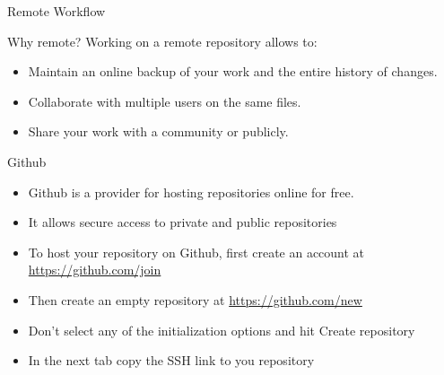 \begin{frame}[fragile]{Remote Workflow}
\end{frame}

\begin{frame}[fragile]{Why remote?}
    Working on a remote repository allows to:
    \begin{itemize}[<+->]
        \item Maintain an online backup of your work and the entire history of changes.
        \item Collaborate with multiple users on the same files.
        \item Share your work with a community or publicly.
    \end{itemize}
\end{frame}

\begin{frame}[fragile]{Github}
    \begin{itemize}
        \item Github is a provider for hosting repositories online for free.
        \item It allows secure access to private and public repositories
        \item To host your repository on Github, first create an account at \url{https://github.com/join}
        \item Then create an empty repository at \url{https://github.com/new}
        \item Don't select any of the initialization options and hit \alert{Create repository}
        \item In the next tab copy the \alert{SSH} link to you repository
    \end{itemize}
\end{frame}

